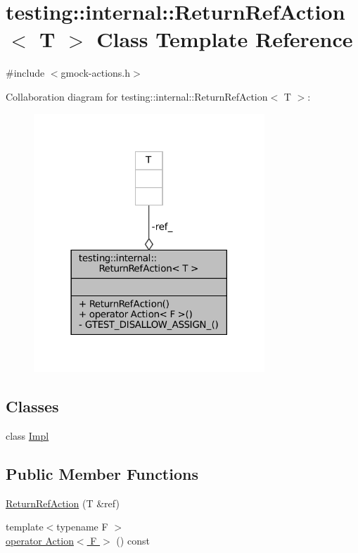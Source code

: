 \hypertarget{classtesting_1_1internal_1_1ReturnRefAction}{}\section{testing\+:\+:internal\+:\+:Return\+Ref\+Action$<$ T $>$ Class Template Reference}
\label{classtesting_1_1internal_1_1ReturnRefAction}


{\ttfamily \#include $<$gmock-\/actions.\+h$>$}



Collaboration diagram for testing\+:\+:internal\+:\+:Return\+Ref\+Action$<$ T $>$\+:
\nopagebreak
\begin{figure}[H]
\begin{center}
\leavevmode
\includegraphics[width=246pt]{classtesting_1_1internal_1_1ReturnRefAction__coll__graph}
\end{center}
\end{figure}
\subsection*{Classes}
\begin{DoxyCompactItemize}
\item 
class \hyperlink{classtesting_1_1internal_1_1ReturnRefAction_1_1Impl}{Impl}
\end{DoxyCompactItemize}
\subsection*{Public Member Functions}
\begin{DoxyCompactItemize}
\item 
\hyperlink{classtesting_1_1internal_1_1ReturnRefAction_a1384b1cd78f3069f0493e2302f143701}{Return\+Ref\+Action} (T \&ref)
\item 
{\footnotesize template$<$typename F $>$ }\\\hyperlink{classtesting_1_1internal_1_1ReturnRefAction_a48e5d411097707e558af62eb68edc162}{operator Action$<$ F $>$} () const
\end{DoxyCompactItemize}
